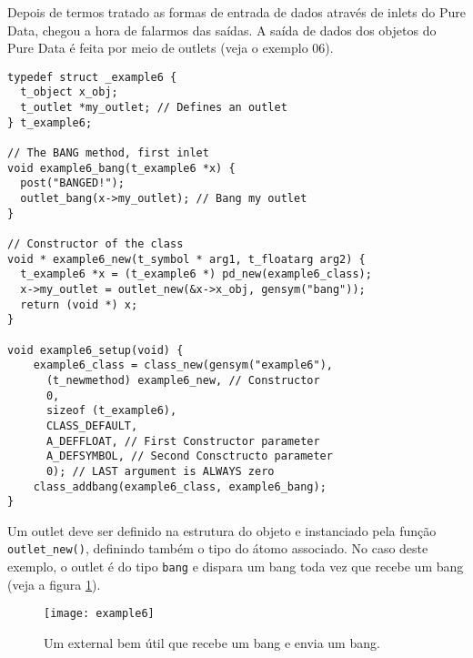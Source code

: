 Depois de termos tratado as formas de entrada de dados através de inlets do
Pure Data, chegou a hora de falarmos das saídas. A saída de dados dos objetos
do Pure Data é feita por meio de outlets (veja o exemplo 06).

\begin{lstlisting}
typedef struct _example6 {
  t_object x_obj;
  t_outlet *my_outlet; // Defines an outlet
} t_example6;

// The BANG method, first inlet
void example6_bang(t_example6 *x) {
  post("BANGED!");
  outlet_bang(x->my_outlet); // Bang my outlet
}

// Constructor of the class
void * example6_new(t_symbol * arg1, t_floatarg arg2) {
  t_example6 *x = (t_example6 *) pd_new(example6_class);
  x->my_outlet = outlet_new(&x->x_obj, gensym("bang"));
  return (void *) x;
}

void example6_setup(void) {
    example6_class = class_new(gensym("example6"),
      (t_newmethod) example6_new, // Constructor
      0, 
      sizeof (t_example6),
      CLASS_DEFAULT,
      A_DEFFLOAT, // First Constructor parameter
      A_DEFSYMBOL, // Second Consctructo parameter
      0); // LAST argument is ALWAYS zero
    class_addbang(example6_class, example6_bang);
}
\end{lstlisting}

Um outlet deve ser definido na estrutura do objeto e instanciado pela função
\texttt{outlet\_new()}, definindo também o tipo do átomo associado. No caso
deste exemplo, o outlet é do tipo \texttt{bang} e dispara um bang toda vez que
recebe um bang (veja a figura \ref{fig:outlet-bang}).

\begin{figure}[h!]
\centering
\texttt{[image: example6]}
\caption{Um external bem útil que recebe um bang e envia um bang.}
\label{fig:outlet-bang}
\end{figure}

